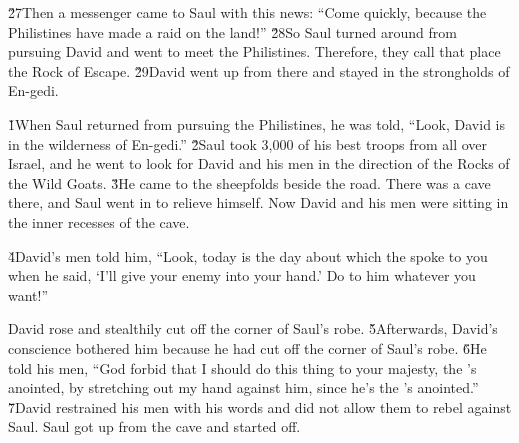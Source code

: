 \v{27}Then a messenger came to Saul with this news: ``Come quickly, because the Philistines have made a raid on the land!'' \v{28}So Saul turned around from pursuing David and went to meet the Philistines. Therefore, they call that place the Rock of Escape. \v{29}David went up from there and stayed in the strongholds of En-gedi.

\v{1}When Saul returned from pursuing the Philistines, he was told, ``Look, David is in the wilderness of En-gedi.'' \v{2}Saul took 3,000 of his best troops from all over Israel, and he went to look for David and his men in the direction of the Rocks of the Wild Goats. \v{3}He came to the sheepfolds beside the road. There was a cave there, and Saul went in to relieve himself. Now David and his men were sitting in the inner recesses of the cave.

\v{4}David's men told him, ``Look, today is the day about which the  spoke to you when he said, `I'll give your enemy into your hand.' Do to him whatever you want!''

David rose and stealthily cut off the corner of Saul's robe. \v{5}Afterwards, David's conscience bothered him because he had cut off the corner of Saul's robe. \v{6}He told his men, ``God forbid that I should do this thing to your majesty, the 's anointed, by stretching out my hand against him, since he's the 's anointed.'' \v{7}David restrained his men with his words and did not allow them to rebel against Saul. Saul got up from the cave and started off.

